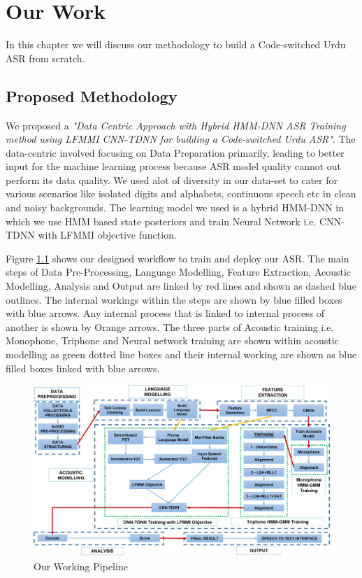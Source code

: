 \chapter{Our Work} %
\label{cha:our_work}

In this chapter we will discuss our methodology to build a Code-switched Urdu ASR from scratch.

\section{Proposed Methodology}

We proposed a \textit{"Data Centric Approach with Hybrid HMM-DNN ASR Training method using LFMMI CNN-TDNN for building a Code-switched Urdu ASR"}. The data-centric involved focusing on Data Preparation primarily, leading to better input for the machine learning process because ASR model quality cannot out perform its data quality. We used alot of diversity in our data-set to cater for various scenarios like isolated digits and alphabets, continuous speech etc in clean and noisy backgrounds. The learning model we used is a hybrid HMM-DNN in which we use HMM based state posteriors and train Neural Network i.e. CNN-TDNN with LFMMI objective function.

Figure \ref{fig:working_pipeline} shows our designed workflow to train and deploy our ASR. The main steps of Data Pre-Processing, Language Modelling, Feature Extraction, Acoustic Modelling, Analysis and Output are linked by red lines and shown as dashed blue outlines. The internal workings within the steps are shown by blue filled boxes with blue arrows. Any internal process that is linked to internal process of another is shown by Orange arrows. The three parts of Acoustic training i.e. Monophone, Triphone and Neural network training are shown within acoustic modelling as green dotted line boxes and their internal working are shown as blue filled boxes linked with blue arrows.

\begin{landscape}
    \begin{figure}[htb]
    \centering
    \includegraphics[width=1.5\textwidth]{img/workflow.png}
    \caption{Our Working Pipeline}
    \label{fig:working_pipeline}
\end{figure}
\end{landscape}

